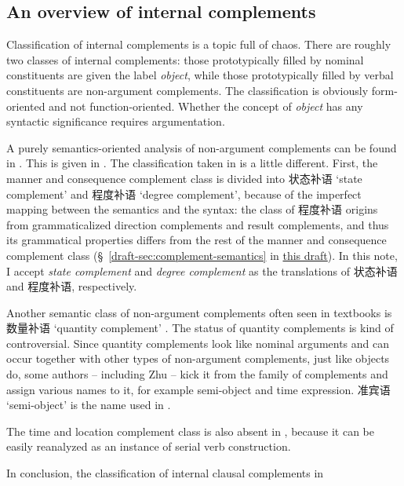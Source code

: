 \documentclass[UTF8, a4paper, oneside, scheme=plain]{ctexart}
\newcommand*{\citesec}[1]{\S~{#1}}
\newcommand*{\term}[1]{\emph{#1}}
\newcommand{\draft}{\href{./main.pdf}{this draft}}
\newcommand{\translate}[1]{`#1'}
\begin{document}
\subsection{An overview of internal complements}



Classification of internal complements is a topic full of chaos.
There are roughly two classes of internal complements:
those prototypically filled by nominal constituents are given the label \term{object},
while those prototypically filled by verbal constituents are non-argument complements.
The classification is obviously form-oriented and not function-oriented.
Whether the concept of \term{object} has any syntactic significance requires argumentation. %

A purely semantics-oriented analysis of non-argument complements 
can be found in .
This is given in \cite[5.8]{xianhan2004}.
The classification taken in \citet{zhudexigrammar} is a little different.
First, the manner and consequence complement class 
is divided into 状态补语 \translate{state complement}
and 程度补语 \translate{degree complement},
because of the imperfect mapping 
between the semantics and the syntax: 
the class of 程度补语 origins from grammaticalized direction complements and result complements,
and thus its grammatical properties differs from the rest of the manner and consequence complement class
(\citesec{\ref{draft-sec:complement-semantics}} in \draft).
In this note, I accept \term{state complement} and \term{degree complement}
as the translations of 状态补语 and 程度补语, respectively.

Another semantic class of non-argument complements often seen in textbooks is 
数量补语 \translate{quantity complement} \citep[\citesec{7.1}]{zhuqingming2005}.
The status of quantity complements  is kind of controversial.
Since quantity complements look like nominal arguments 
and can occur together with other types of non-argument complements, 
just like objects do, some authors -- including Zhu -- 
kick it from the family of complements and assign various names to it, 
for example semi-object and time expression. 
准宾语 \translate{semi-object} is the name used in \citet{zhudexigrammar}. %

The time and location complement class is also absent in \citet{zhudexigrammar},
because it can be easily reanalyzed as an instance of serial verb construction.

In conclusion, the classification of internal clausal complements in \citet{zhudexigrammar} %
\end{document}
